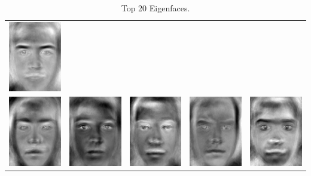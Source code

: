 \documentclass[12pt]{article}
\begin{document}
\begin{enumerate}
\begin{enumerate}
\begin{table}[H]
\begin{tabular}{ccccc}
\includegraphics[width=1in]{pca/14}\\\includegraphics[width=1in]{pca/15}&
\includegraphics[width=1in]{pca/16}&\includegraphics[width=1in]{pca/17}&
\includegraphics[width=1in]{pca/18}&\includegraphics[width=1in]{pca/19}\\
\end{tabular}
\caption{Top 20 Eigenfaces.}

\end{table}
\end{enumerate}
\end{enumerate}
\end{document}
